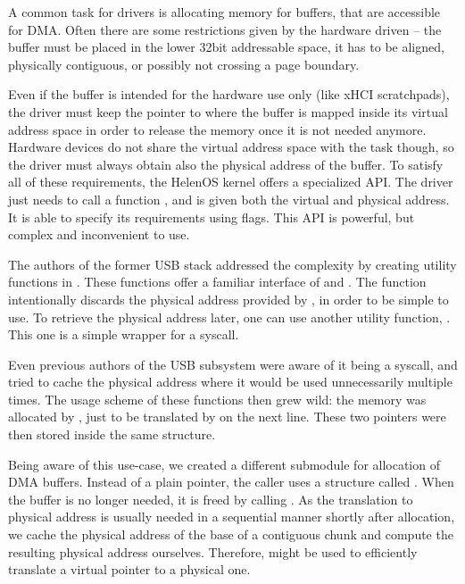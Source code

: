 A common task for drivers is allocating memory for buffers, that are accessible
for DMA. Often there are some restrictions given by the hardware driven -- the
buffer must be placed in the lower 32bit addressable space, it has to be
aligned, physically contiguous, or possibly not crossing a page boundary.

Even if the buffer is intended for the hardware use only (like xHCI
scratchpads), the driver must keep the pointer to where the buffer is mapped
inside its virtual address space in order to release the memory once it is not
needed anymore. Hardware devices do not share the virtual address space with
the task though, so the driver must always obtain also the physical address of
the buffer. To satisfy all of these requirements, the HelenOS kernel offers
a specialized API. The driver just needs to call a function
, and is given both the virtual and physical address. It
is able to specify its requirements using flags. This API is powerful, but
complex and inconvenient to use.

The authors of the former USB stack addressed the complexity by creating
utility functions in
.
These functions offer
a familiar interface of  and . The  function
intentionally discards the physical address provided by
, in order to be simple to use. To retrieve the physical
address later, one can use another utility function, . This
one is a simple wrapper for a syscall.

Even previous authors of the USB subsystem were aware of it being a syscall,
and tried to cache the physical address where it would be used unnecessarily
multiple times. The usage scheme of these functions then grew wild: the memory
was allocated by , just to be translated by  on
the next line. These two pointers were then stored inside the same structure.

Being aware of this use-case, we created a different submodule for allocation
of DMA buffers. Instead of a plain pointer, the caller uses a structure called
. When the buffer is no longer needed, it is freed by
calling . As the translation to physical address is
usually needed in a sequential manner shortly after allocation, we cache the
physical address of the base of a contiguous chunk and compute the resulting
physical address ourselves. Therefore,  might be used to
efficiently translate a virtual pointer to a physical one.

